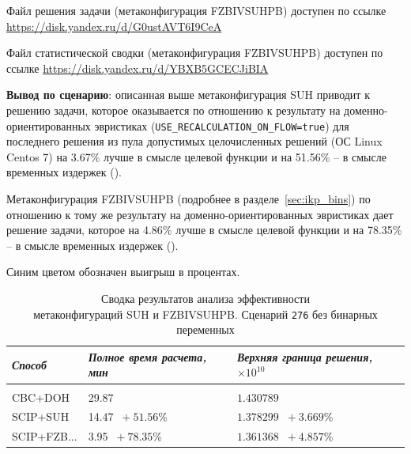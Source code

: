 \documentclass[%
	11pt,
	a4paper,
	utf8,
		]{article}
\begin{document}
Файл решения задачи (метаконфигурация FZBIVSUHPB) доступен по ссылке \url{https://disk.yandex.ru/d/G0ustAVT6I9CeA}

Файл статистической сводки (метаконфигурация FZBIVSUHPB) доступен по ссылке \url{https://disk.yandex.ru/d/YBXB5GCECJiBIA}

\vspace*{3mm}
\textbf{Вывод по сценарию}: описанная выше метаконфигурация SUH приводит к решению задачи, которое оказывается по отношению к результату на доменно-ориентированных эвристиках (\verb|USE_RECALCULATION_ON_FLOW=true|) для последнего решения из пула допустимых целочисленных решений (ОС Linux Centos 7) на 3.67\% лучше в смысле целевой функции и на 51.56\% -- в смысле временных издержек ().

Метаконфигурация FZBIVSUHPB (подробнее в разделе~\ref{sec:ikp_bins}) по отношению к тому же результату на доменно-ориентированных эвристиках дает решение задачи, которое на 4.86\% лучше в смысле целевой функции и на 78.35\% -- в смысле временных издержек ().

Синим цветом обозначен выигрыш в процентах.

{
	\begin{table}[!h]
		\centering
		\caption{Сводка результатов анализа эффективности \\метаконфигураций SUH и FZBIVSUHPB. Сценарий \texttt{276} без бинарных переменных}
		\begin{tabular}{ p{2.5cm} p{3.3cm} p{3.4cm} }
			\emph{Способ} & \emph{Полное время расчета, мин} & \emph{Верхняя граница решения, $ \times 10^{10} $} \\
			\hline\hline\\[-3.5mm]
			{CBC+DOH} & 29.87 & $ 1.430789 $ \\
			\hline
			SCIP+SUH & 14.47 {\color{blue} $\ +51.56 $\%} & $ 1.378299 $ {\color{blue} $\ +3.669 $\%} \\
			\hline
			SCIP+FZB... & 3.95 {\color{blue} $\ +78.35 $\%} & $ 1.361368 $ {\color{blue} $\ +4.857 $\%} \\
		\end{tabular}\label{tab:276_wo_bins}
	\end{table}
}
\end{document}
